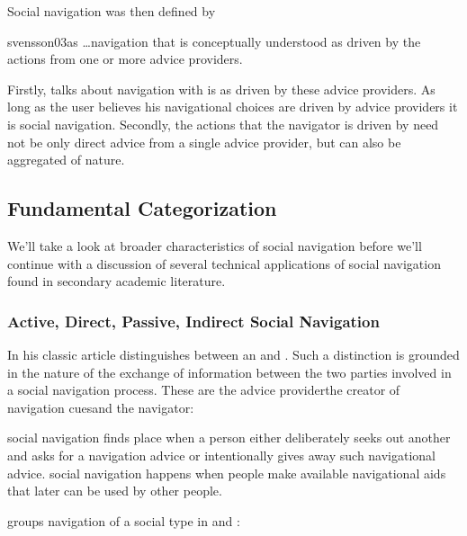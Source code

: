 Social navigation was then defined by
\begin{fullquote}[\p{20}]{svensson03}{as}
  \dots navigation that is conceptually understood as driven by the actions
  from one or more advice providers.
\end{fullquote}

Firstly, \citeauthor{svensson03} talks about navigation with is
 as driven by these advice providers. As long as
the user believes his navigational choices are driven by advice providers it
is social navigation. Secondly, the actions that the navigator is driven by
need not be only direct advice from a single advice provider, but can also be
aggregated of nature.

\subsection{Fundamental Categorization}
\label{section:social.navigation.fundamental.categorization}

We'll take a look at broader characteristics of social navigation
before we'll continue with a discussion of several technical applications of
social navigation found in secondary academic literature.

\subsubsection{Active, Direct, Passive, \oldand Indirect Social Navigation}

In his classic article \citet{dieberger97} distinguishes between an
 and .
Such a distinction is grounded in the nature of the exchange of information
between the two parties involved in a social navigation process.
These are the advice provider\dash{}the creator of navigation
cues\dash{}and the navigator:

\begin{items}
   social navigation finds place when a person either
    deliberately seeks out another and asks for a navigation advice or
    intentionally gives away such navigational advice.
   social navigation happens when people make available
    navigational aids that later can be used by other people.
\end{items}

\citeauthor{svensson03} groups navigation of a social type in
 and :

